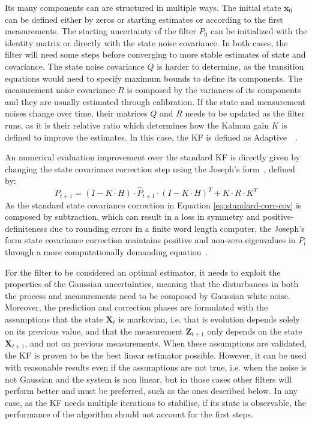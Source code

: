 Its many components can are structured in multiple ways.
The initial state $\mathbf{x}_{0}$ can be defined either by zeros or starting estimates or according to the first measurements.
The starting uncertainty of the filter $P_0$ can be initialized with the identity matrix or directly with the state noise covariance. In both cases, the filter will need some steps before converging to more stable estimates of state and covariance.
The state noise covariance $Q$ is harder to determine, as the transition equations would need to specify maximum bounds to define its components.
The measurement noise covariance $R$ is composed by the variances of its components and they are usually estimated through calibration.
If the state and measurement noises change over time, their matrices $Q$ and $R$ needs to be updated as the filter runs, as it is their relative ratio which determines how the Kalman gain $K$ is defined to improve the estimates. In this case, the \gls{KF} is defined as Adaptive~\cite{adaptive}~\cite{1099422}.


An numerical evaluation improvement over the standard \gls{KF} is directly given by changing the state covariance correction step using the Joseph’s form~\cite{schmidt_analysis_2010}, defined by:
\begin{equation}
    P_{t+1} = (I - K \cdot H) \cdot \hat{P}_{t+1} \cdot (I - K \cdot H)^T + K \cdot R \cdot K^T
\end{equation}
As the standard state covariance correction in Equation \eqref{eq:standard-corr-cov} is composed by subtraction, which can result in a loss in symmetry and positive-definiteness due to rounding errors in a finite word length computer, the Joseph’s form state covariance correction maintains positive and non-zero eigenvalues in $P_t$ through a more computationally demanding equation~\cite{BarShalom2001EstimationWA}.

For the filter to be considered an optimal estimator, it needs to exploit the properties of the Gaussian uncertainties, meaning that the disturbances in both the process and measurements need to be composed by Gaussian white noise.
Moreover, the prediction and correction phases are formulated with the assumptions that the state $\mathbf{X}_t$ is markovian, i.e. that is evolution depends solely on its previous value, and that the measurement $\mathbf{Z}_{t+1}$ only depends on the state $\mathbf{X}_{t+1}$, and not on previous measurements.
When these assumptions are validated, the \gls{KF} is proven to be the best linear estimator possible.
However, it can be used with reasonable results even if the assumptions are not true, i.e. when the noise is not Gaussian and the system is non linear, but in those cases other filters will perform better and must be preferred, such as the ones described below.
In any case, as the \gls{KF} needs multiple iterations to stabilise, if its state is observable, the performance of the algorithm should not account for the first steps.

